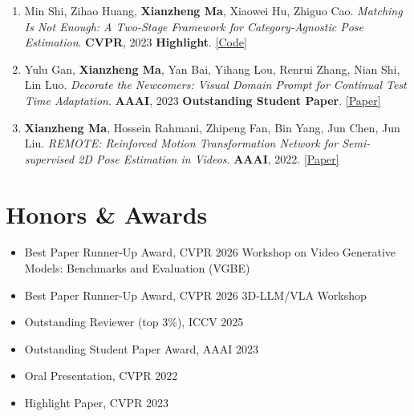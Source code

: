 \documentclass[11pt,a4paper]{article}
\newcommand{\paper}[4]{%
  \item #1. \textit{#2}. #3. #4
}
\begin{document}
\begin{enumerate}[leftmargin=*, labelsep=0.5em, itemsep=4pt]
\paper{Min Shi, Zihao Huang, \textbf{Xianzheng Ma}, Xiaowei Hu, Zhiguo Cao}
{Matching Is Not Enough: A Two-Stage Framework for Category-Agnostic Pose Estimation}
{\textbf{CVPR}, 2023 \textbf{Highlight}}
{\href{https://github.com/flyinglynx/CapeFormer}{[Code]}}

\paper{Yulu Gan, \textbf{Xianzheng Ma}, Yan Bai, Yihang Lou, Renrui Zhang, Nian Shi, Lin Luo}
{Decorate the Newcomers: Visual Domain Prompt for Continual Test Time Adaptation}
{\textbf{AAAI}, 2023 \textbf{Outstanding Student Paper}}
{\href{https://arxiv.org/abs/2212.04145v1}{[Paper]}}

\paper{\textbf{Xianzheng Ma}, Hossein Rahmani, Zhipeng Fan, Bin Yang, Jun Chen, Jun Liu}
{REMOTE: Reinforced Motion Transformation Network for Semi-supervised 2D Pose Estimation in Videos}
{\textbf{AAAI}, 2022}
{\href{https://ojs.aaai.org/index.php/AAAI/article/view/20089/19848}{[Paper]}}

\end{enumerate}


\section{Honors \& Awards}
\begin{itemize}[leftmargin=*, labelsep=0.5em, itemsep=2pt]
  \item Best Paper Runner-Up Award, CVPR 2026 Workshop on Video Generative Models: Benchmarks and Evaluation (VGBE)
  \item Best Paper Runner-Up Award, CVPR 2026 3D-LLM/VLA Workshop
  \item Outstanding Reviewer (top 3\%), ICCV 2025
  \item Outstanding Student Paper Award, AAAI 2023
  \item Oral Presentation, CVPR 2022
  \item Highlight Paper, CVPR 2023
\end{itemize}

\end{document}
